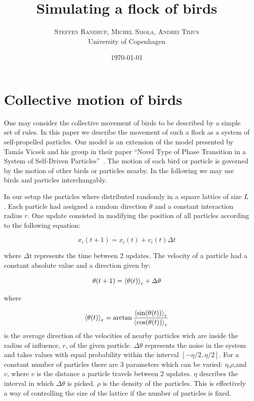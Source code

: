 \documentclass[twoside,twocolumn]{article}
\title{Simulating a flock of birds} %
\author{%
\textsc{Steffen Randrup, Michel Smola, Andrei Timus}\\[1ex] %
\normalsize University of Copenhagen \\ %
}
\date{\today} %
\begin{document}
\maketitle


\section{Collective motion of birds}

One may consider the collective movement of birds to be described by a simple set of rules.
In this paper we describe the movement of such a flock as a system of self-propelled particles.
Our model is an extension of the model presented by Tamás Vicsek and his group in their paper ``Novel Type of Phase Transition in a System of Self-Driven Particles''~\cite{Vicsek}.
The motion of each bird or particle is governed by the motion of other birds or particles nearby.
In the following we may use birds and particles interchangably.

In our setup the particles where distributed randomly in a square lattice of size $L$.
Each particle had assigned a random direction $\theta$ and a constant interaction radius $r$.
One update consisted in modifying the position of all particles according to the following equation:


\begin{equation}
x_{i}(t+1)=x_i(t)+v_i(t)\Delta t
\end{equation}

where $\Delta$t represents the time between 2 updates.
The velocity of a particle had a constant absolute value and a direction given by:

\begin{equation}
\theta(t+1)=\braket{\theta(t)}_r+\Delta \theta
\end{equation} 

where 

\begin{equation}
  \braket{\theta(t)}_r=\arctan\frac{\braket{\sin(\theta(t))}_r}{\braket{\cos(\theta(t))}_r}
\end{equation}
%
is the average direction of the velocities of nearby particles wich are inside the radius of influence, $r$, of the given particle.
$\Delta \theta$ represents the noise in the system and takes values with equal probability within the interval $[-\eta/2,\eta/2]$.
For a constant number of particles there are 3 parameters which can be varied: $\eta$,$\rho$,and $v$,
where $v$ is the distance a particle travels between 2 updates.
$\eta$ describes the interval in which $\Delta\theta$ is picked. $\rho$ is the density of the particles.
This is effectively a way of controlling the size of the lattice if the number of particles is fixed.
\end{document}
